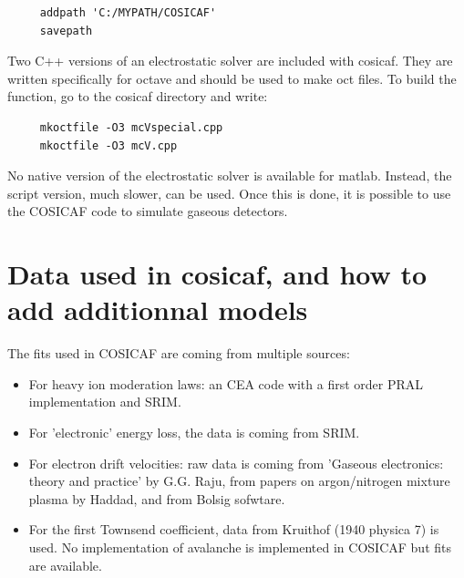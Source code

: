 \documentclass[10pt]{article}
\begin{document}
	 \begin{lstlisting}
	 addpath 'C:/MYPATH/COSICAF'
	 savepath	 
	 \end{lstlisting}
	 
	 Two C++ versions of an electrostatic solver are included with cosicaf. They are written specifically for octave and should be used to make oct files. To build the function, go to the cosicaf directory and write:
	 
	 \begin{lstlisting}
	 mkoctfile -O3 mcVspecial.cpp
	 mkoctfile -O3 mcV.cpp
	 \end{lstlisting}
	 
	 No native version of the electrostatic solver is available for matlab. Instead, the script version, much slower, can be used.
	 Once this is done, it is possible to use the COSICAF code to simulate gaseous detectors.
	 
	
%	
%	
%	    
	
	\section{Data used in cosicaf, and how to add additionnal models}
	The fits used in COSICAF are coming from multiple sources:
	
	\begin{itemize}
		\item For heavy ion moderation laws: an CEA code with a first order PRAL implementation and SRIM.
		\item For 'electronic' energy loss, the data is coming from SRIM.
		\item For electron drift velocities: raw data is coming from 'Gaseous electronics: theory and practice' by G.G. Raju, from papers on argon/nitrogen mixture plasma by Haddad, and from Bolsig sofwtare.
		\item For the first Townsend coefficient, data from Kruithof (1940 physica 7) is used. No implementation of avalanche is implemented in COSICAF but fits are available.
	\end{itemize}
	
\end{document}
